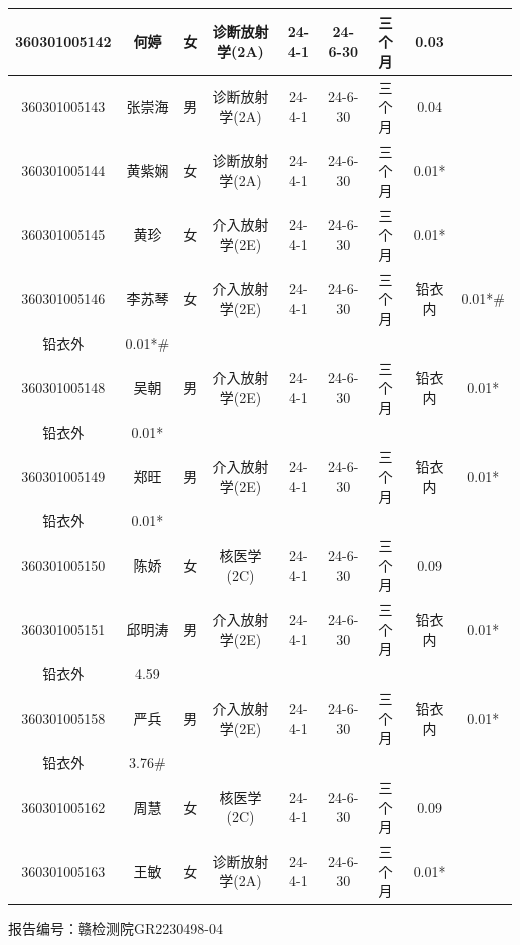 \begin{table}[H]
\begin{tabular}{|c|c|c|c|c|c|c|c|c|}
\hline
360301005142 & 何婷 & 女 & 诊断放射学(2A) & 24-4-1 & 24-6-30 & 三个月 & 0.03 &  \\
\hline
360301005143 & 张崇海 & 男 & 诊断放射学(2A) & 24-4-1 & 24-6-30 & 三个月 & 0.04 &  \\
\hline
360301005144 & 黄紫娴 & 女 & 诊断放射学(2A) & 24-4-1 & 24-6-30 & 三个月 & 0.01* &  \\
\hline
360301005145 & 黄珍 & 女 & 介入放射学(2E) & 24-4-1 & 24-6-30 & 三个月 & 0.01* &  \\
\hline
360301005146 & 李苏琴 & 女 & 介入放射学(2E) & 24-4-1 & 24-6-30 & 三个月 & 铅衣内 & 0.01*\# \\
\hline
铅衣外 & 0.01*\# &  &  &  &  &  &  &  \\
\hline
360301005148 & 吴朝 & 男 & 介入放射学(2E) & 24-4-1 & 24-6-30 & 三个月 & 铅衣内 & 0.01* \\
\hline
铅衣外 & 0.01* &  &  &  &  &  &  &  \\
\hline
360301005149 & 郑旺 & 男 & 介入放射学(2E) & 24-4-1 & 24-6-30 & 三个月 & 铅衣内 & 0.01* \\
\hline
铅衣外 & 0.01* &  &  &  &  &  &  &  \\
\hline
360301005150 & 陈娇 & 女 & 核医学(2C) & 24-4-1 & 24-6-30 & 三个月 & 0.09 &  \\
\hline
360301005151 & 邱明涛 & 男 & 介入放射学(2E) & 24-4-1 & 24-6-30 & 三个月 & 铅衣内 & 0.01* \\
\hline
铅衣外 & 4.59 &  &  &  &  &  &  &  \\
\hline
360301005158 & 严兵 & 男 & 介入放射学(2E) & 24-4-1 & 24-6-30 & 三个月 & 铅衣内 & 0.01* \\
\hline
铅衣外 & 3.76\# &  &  &  &  &  &  &  \\
\hline
360301005162 & 周慧 & 女 & 核医学(2C) & 24-4-1 & 24-6-30 & 三个月 & 0.09 &  \\
\hline
360301005163 & 王敏 & 女 & 诊断放射学(2A) & 24-4-1 & 24-6-30 & 三个月 & 0.01* &  \\
\hline
\end{tabular}
\end{table}


报告编号：赣检测院GR2230498-04


